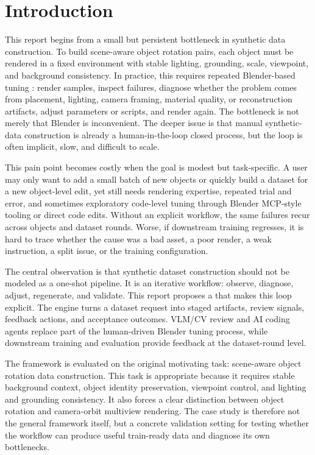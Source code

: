 \section{Introduction}
\label{sec:introduction}

This report begins from a small but persistent bottleneck in synthetic data construction. To build scene-aware object rotation pairs, each object must be rendered in a fixed environment with stable lighting, grounding, scale, viewpoint, and background consistency. In practice, this requires repeated Blender-based tuning \cite{blenderFoundationBlender}: render samples, inspect failures, diagnose whether the problem comes from placement, lighting, camera framing, material quality, or reconstruction artifacts, adjust parameters or scripts, and render again. The bottleneck is not merely that Blender is inconvenient. The deeper issue is that manual synthetic-data construction is already a human-in-the-loop closed process, but the loop is often implicit, slow, and difficult to scale.

This pain point becomes costly when the goal is modest but task-specific. A user may only want to add a small batch of new objects or quickly build a dataset for a new object-level edit, yet still needs rendering expertise, repeated trial and error, and sometimes exploratory code-level tuning through Blender MCP-style tooling or direct code edits. Without an explicit workflow, the same failures recur across objects and dataset rounds. Worse, if downstream training regresses, it is hard to trace whether the cause was a bad asset, a poor render, a weak instruction, a split issue, or the training configuration.

The central observation is that synthetic dataset construction should not be modeled as a one-shot pipeline. It is an iterative workflow: observe, diagnose, adjust, regenerate, and validate. This report proposes a \method{} that makes this loop explicit. The engine turns a dataset request into staged artifacts, review signals, feedback actions, and acceptance outcomes. VLM/CV review and AI coding agents replace part of the human-driven Blender tuning process, while downstream training and evaluation provide feedback at the dataset-round level.

The framework is evaluated on the original motivating task: scene-aware object rotation data construction. This task is appropriate because it requires stable background context, object identity preservation, viewpoint control, and lighting and grounding consistency. It also forces a clear distinction between object rotation and camera-orbit multiview rendering. The case study is therefore not the general framework itself, but a concrete validation setting for testing whether the workflow can produce useful train-ready data and diagnose its own bottlenecks.

